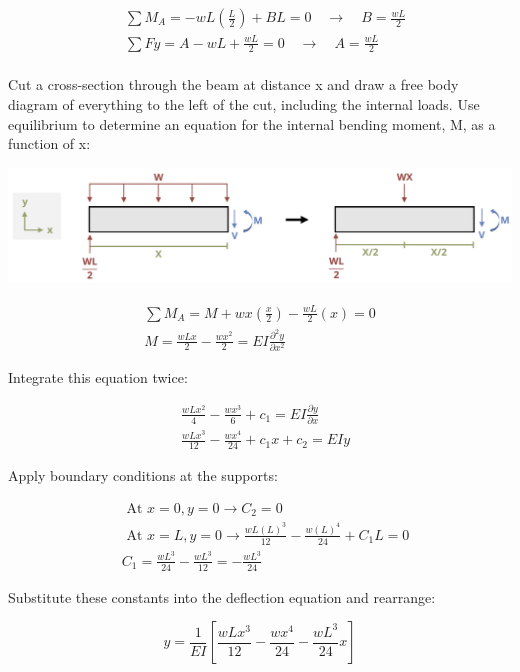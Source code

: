\documentclass[
  letterpaper,
  DIV=11,
  numbers=noendperiod]{scrreprt}
\begin{document}
\begin{tcolorbox}
\begin{tcolorbox}
\[
\begin{aligned}
& \sum M_A=-wL\left(\frac{L}{2}\right)+B L=0 \quad \rightarrow \quad B=\frac{wL}{2} \\
& \sum F y= A-wL+\frac{wL}{2}=0 \quad\rightarrow\quad A=\frac{wL}{2} \\
& \end{aligned}
\]

Cut a cross-section through the beam at distance x and draw a free body
diagram of everything to the left of the cut, including the internal
loads. Use equilibrium to determine an equation for the internal bending
moment, M, as a function of x:

\begin{center}
\includegraphics{images/CH11 PNGs/example11.1-3.png}
\end{center}

\[
\begin{gathered} \sum M_A= M+w x\left(\frac{x}{2}\right)-\frac{w L}{2}(x)=0 \\ M =\frac{w L x}{2}-\frac{w x^2}{2}=E I \frac{\partial^2 y}{\partial x^2}\end{gathered}
\]

Integrate this equation twice:

\[
\begin{aligned} & \frac{w L x^2}{4}-\frac{w x^3}{6}+c_1=E I \frac{\partial y}{\partial x} \\ & \frac{w L x^3}{12}-\frac{w x^4}{24}+c_1 x+c_2=E I y\end{aligned}
\]

Apply boundary conditions at the supports:

\[
\begin{aligned} & \text { At } x=0, y=0 \rightarrow C_2=0 \\ & \text { At } x=L, y=0 \rightarrow \frac{w L(L)^3}{12}-\frac{w(L)^4}{24}+C_1 L=0 \\ & C_1=\frac{w L^3}{24}-\frac{wL^3}{12}=-\frac{w L^3}{24}\end{aligned}
\]

Substitute these constants into the deflection equation and rearrange:

\[
y=\frac{1}{E I}\left[\frac{w L x^3}{12}-\frac{w x^4}{24}-\frac{wL^3}{24} x\right]
\]


\end{tcolorbox}
\end{tcolorbox}
\end{document}
